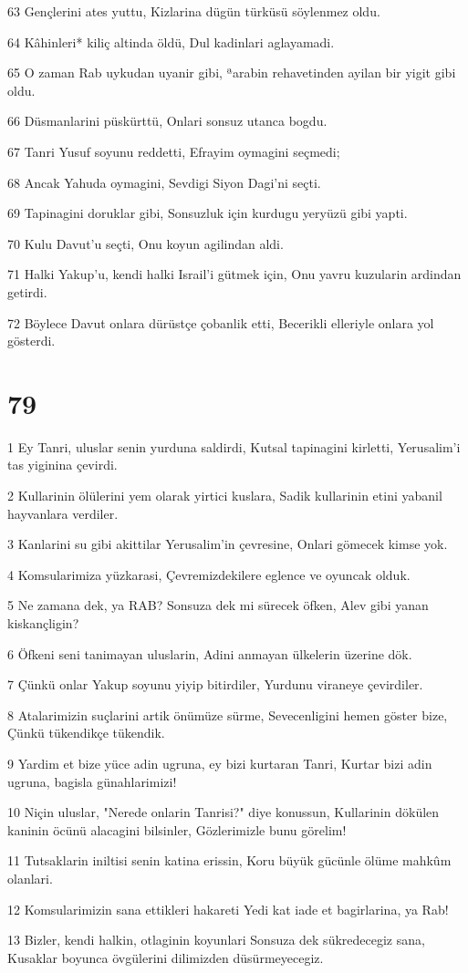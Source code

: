 \par 63 Gençlerini ates yuttu, Kizlarina dügün türküsü söylenmez oldu.
\par 64 Kâhinleri* kiliç altinda öldü, Dul kadinlari aglayamadi.
\par 65 O zaman Rab uykudan uyanir gibi, ªarabin rehavetinden ayilan bir yigit gibi oldu.
\par 66 Düsmanlarini püskürttü, Onlari sonsuz utanca bogdu.
\par 67 Tanri Yusuf soyunu reddetti, Efrayim oymagini seçmedi;
\par 68 Ancak Yahuda oymagini, Sevdigi Siyon Dagi'ni seçti.
\par 69 Tapinagini doruklar gibi, Sonsuzluk için kurdugu yeryüzü gibi yapti.
\par 70 Kulu Davut'u seçti, Onu koyun agilindan aldi.
\par 71 Halki Yakup'u, kendi halki Israil'i gütmek için, Onu yavru kuzularin ardindan getirdi.
\par 72 Böylece Davut onlara dürüstçe çobanlik etti, Becerikli elleriyle onlara yol gösterdi.

\chapter{79}

\par 1 Ey Tanri, uluslar senin yurduna saldirdi, Kutsal tapinagini kirletti, Yerusalim'i tas yiginina çevirdi.
\par 2 Kullarinin ölülerini yem olarak yirtici kuslara, Sadik kullarinin etini yabanil hayvanlara verdiler.
\par 3 Kanlarini su gibi akittilar Yerusalim'in çevresine, Onlari gömecek kimse yok.
\par 4 Komsularimiza yüzkarasi, Çevremizdekilere eglence ve oyuncak olduk.
\par 5 Ne zamana dek, ya RAB? Sonsuza dek mi sürecek öfken, Alev gibi yanan kiskançligin?
\par 6 Öfkeni seni tanimayan uluslarin, Adini anmayan ülkelerin üzerine dök.
\par 7 Çünkü onlar Yakup soyunu yiyip bitirdiler, Yurdunu viraneye çevirdiler.
\par 8 Atalarimizin suçlarini artik önümüze sürme, Sevecenligini hemen göster bize, Çünkü tükendikçe tükendik.
\par 9 Yardim et bize yüce adin ugruna, ey bizi kurtaran Tanri, Kurtar bizi adin ugruna, bagisla günahlarimizi!
\par 10 Niçin uluslar, "Nerede onlarin Tanrisi?" diye konussun, Kullarinin dökülen kaninin öcünü alacagini bilsinler, Gözlerimizle bunu görelim!
\par 11 Tutsaklarin iniltisi senin katina erissin, Koru büyük gücünle ölüme mahkûm olanlari.
\par 12 Komsularimizin sana ettikleri hakareti Yedi kat iade et bagirlarina, ya Rab!
\par 13 Bizler, kendi halkin, otlaginin koyunlari Sonsuza dek sükredecegiz sana, Kusaklar boyunca övgülerini dilimizden düsürmeyecegiz.

